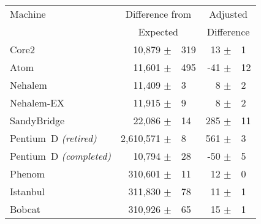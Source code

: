 %

\begin{tabular}{|l||rl|rl|}

\hline
Machine   & \multicolumn{2}{c|}{Difference from} & \multicolumn{2}{c|}{Adjusted} \\
          & \multicolumn{2}{c|}{Expected} & \multicolumn{2}{c|}{Difference} \\
\hline
\hline

Core2          &    10,879 $\pm$ & 319     &     13 $\pm$ & 1  \\
\hline
Atom           &    11,601 $\pm$ & 495    &     -41 $\pm$ & 12 \\
\hline
Nehalem        &    11,409 $\pm$ & 3      &       8 $\pm$ & 2  \\
\hline
Nehalem-EX     &    11,915 $\pm$ & 9      &       8 $\pm$ & 2  \\
\hline
SandyBridge    &    22,086 $\pm$ & 14     &     285 $\pm$ & 11  \\
\hline
Pentium~D {\em \footnotesize (retired)} &   2,610,571 $\pm$ & 8      &     561 $\pm$ & 3 \\
\hline
Pentium~D {\em \footnotesize (completed)} &    10,794 $\pm$ & 28     &     -50 $\pm$ & 5  \\
\hline
Phenom         &   310,601 $\pm$ & 11     &      12 $\pm$ & 0  \\
\hline
Istanbul       &   311,830 $\pm$ & 78     &      11 $\pm$ & 1  \\
\hline
Bobcat         &   310,926 $\pm$ & 65     &      15 $\pm$ & 1  \\
\hline

\end{tabular}

